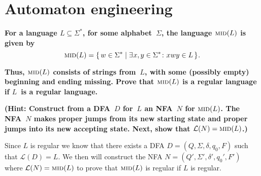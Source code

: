 \documentclass[a4paper]{article}
\begin{document}

\setlength{\parskip}{0.5em}
\setlength{\parindent}{0cm}
\large

\newcommand{\Connect}{\textsc{connect}}
\newcommand{\Mid}{\textsc{mid}}
\newcommand{\Partition}{\mathit{PARTITION}}
\newcommand{\SAT}{\mathit{SAT}}
\newcommand{\SubsetSum}{\mathit{SUBSET} \mbox{-} \mathit{SUM}}
\newcommand{\DominatingSet}{\mathit{DOMINATING} \mbox{-} \mathit{SET}}
\newcommand{\VertexCover}{\mathit{VERTEX} \mbox{-} \mathit{COVER}}

\newcommand{\calL}{\mathcal{L}}
\newcommand{\calP}{\mathcal{P}}
\newcommand{\calS}{\mathcal{S}}
\newcommand{\code}[1]{\langle {#1} \rangle}
\newcommand{\eps}{\varepsilon}
\newcommand{\false}{\mathit{false}}
\newcommand{\lc}{\lbrace \,}
\newcommand{\lpshuffle}{\mathop{\parallel_{\ell p}}}
\newcommand{\pair}[2]{\langle {#1}, \mkern-1mu {#2} \rangle}
\newcommand{\qsubf}{q_{\mkern-2mu f}}
\newcommand{\rc}{\, \rbrace}
\newcommand{\true}{\mathit{true}}
\newcommand{\singleton}[1]{\lbrace {#1} \rbrace}
\newcommand{\xbar}{\bar{x}}


\section{Automaton engineering}
    \textbf{For a language $L \subseteq \Sigma^\ast$, for some alphabet~$\Sigma$, the language $\Mid(L)$ is given by}
    \begin{displaymath}
      \Mid(L) =
      \lbrace \, w \in \Sigma^\ast \mid
      \exists \mkern1mu x,y \in \Sigma^\ast \colon
      x \mkern0.5mu wy \in L
      \, \rbrace \mkern1mu .
    \end{displaymath}

    \textbf{Thus, $\Mid(L)$ consists of strings from~$L$, with some (possibly empty) beginning and ending missing. Prove that $\Mid(L)$ is a regular language if $L$~is a regular language.}

    \medskip

    \textbf{(Hint: Construct from a DFA~$D$ for~$L$ an NFA~$N$ for $\Mid(L)$. The NFA~$N$ makes proper jumps from its new starting state and proper jumps into its new accepting state. Next, show that $\calL(N) = \Mid(L)$.)}

        Since $L$ is regular we know that there exists a DFA $D = (Q, \Sigma, \delta, q_0, F)$ such that $\mathcal{L}(D)=L$. We then will construct the NFA $N = (Q', \Sigma', \delta', q_0', F')$ where $\mathcal{L}(N) = \Mid(L)$ to prove that $\Mid(L)$ is regular if $L$ is regular.
\end{document}
